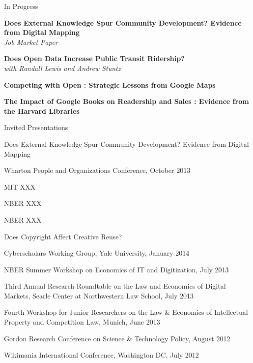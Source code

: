 \documentclass{resume} %
\begin{document}

\begin{rSection}{In Progress}

{\bf Does External Knowledge Spur Community Development? Evidence from Digital Mapping} \\ \emph{Job Market Paper}

{\bf Does Open Data Increase Public Transit Ridership?} \\ \emph{with Randall Lewis and Andrew Stuntz}

{\bf Competing with Open : Strategic Lessons from Google Maps} 

{\bf The Impact of Google Books on Readership and Sales : Evidence from the Harvard Libraries}

\end{rSection}


\begin{rSection}{Invited Presentations}

\begin{rSubsection}{Does External Knowledge Spur Community Development? Evidence from Digital Mapping}{}{}{}
\item Wharton People and Organizations Conference, October 2013
\item MIT XXX
\item NBER XXX
\item NBER XXX
\end{rSubsection}

\begin{rSubsection}{Does Copyright Affect Creative Reuse?}{}{}{}
\item Cyberscholars Working Group, Yale University, January 2014
\item NBER Summer Workshop on Economics of IT and Digitization, July 2013
\item Third Annual Research Roundtable on the Law and Economics of Digital Markets, Searle Center at Northwestern Law School, July 2013
\item Fourth Workshop for Junior Researchers on the Law \& Economics of Intellectual Property and Competition Law, Munich, June 2013
\item Gordon Research Conference on Science \& Technology Policy, August 2012
\item Wikimania International Conference, Washington DC, July 2012 
\end{rSubsection}

\end{rSection}
\end{document}
